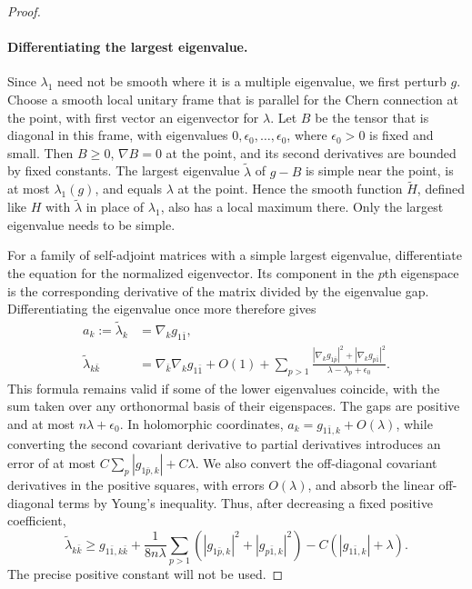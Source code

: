 \begin{proof}
\paragraph{Differentiating the largest eigenvalue.}
Since $\lambda_1$ need not be smooth where it is a multiple eigenvalue, we first perturb $g$. Choose a smooth local unitary frame that is parallel for the Chern connection at the point, with first vector an eigenvector for $\lambda$. Let $B$ be the tensor that is diagonal in this frame, with eigenvalues $0,\epsilon_0,\ldots,\epsilon_0$, where $\epsilon_0>0$ is fixed and small. Then $B\geq0$, $\nabla B=0$ at the point, and its second derivatives are bounded by fixed constants. The largest eigenvalue $\widetilde\lambda$ of $g-B$ is simple near the point, is at most $\lambda_1(g)$, and equals $\lambda$ at the point. Hence the smooth function $\widetilde H$, defined like $H$ with $\widetilde\lambda$ in place of $\lambda_1$, also has a local maximum there. Only the largest eigenvalue needs to be simple.

For a family of self-adjoint matrices with a simple largest eigenvalue, differentiate the equation for the normalized eigenvector. Its component in the $p$th eigenspace is the corresponding derivative of the matrix divided by the eigenvalue gap. Differentiating the eigenvalue once more therefore gives
\begin{align*}
 a_k:=\widetilde\lambda_k&=\nabla_k g_{1\bar1},\\
 \widetilde\lambda_{k\bar k}
 &=\nabla_{\bar k}\nabla_k g_{1\bar1}+O(1)
   +\sum_{p>1}\frac{|\nabla_k g_{1\bar p}|^2+
                            |\nabla_k g_{p\bar1}|^2}
                        {\lambda-\lambda_p+\epsilon_0}.
\end{align*}
This formula remains valid if some of the lower eigenvalues coincide, with the sum taken over any orthonormal basis of their eigenspaces. The gaps are positive and at most $n\lambda+\epsilon_0$. In holomorphic coordinates, $a_k=g_{1\bar1,k}+O(\lambda)$, while converting the second covariant derivative to partial derivatives introduces an error of at most
$C\sum_p|g_{1\bar p,k}|+C\lambda$. We also convert the off-diagonal covariant derivatives in the positive squares, with errors $O(\lambda)$, and absorb the linear off-diagonal terms by Young's inequality. Thus, after decreasing a fixed positive coefficient,
\begin{equation}\label{eq:stw-eigenvalue-basic}
 \widetilde\lambda_{k\bar k}
 \geq g_{1\bar1,k\bar k}
    +\frac1{8n\lambda}\sum_{p>1}
          (|g_{1\bar p,k}|^2+|g_{p\bar1,k}|^2)
    -C(|g_{1\bar1,k}|+\lambda).
\end{equation}
The precise positive constant will not be used.


\end{proof}
